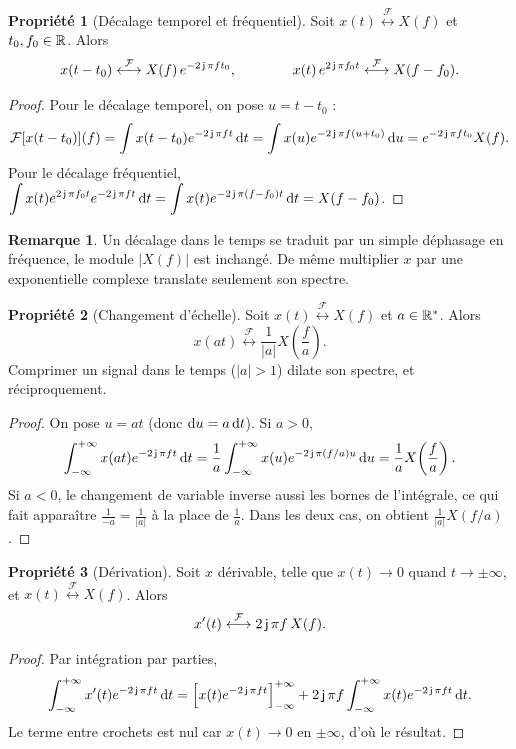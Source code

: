 \documentclass[a4paper,11pt]{article}
\theoremstyle{definition}
\newtheorem{proposition}{Propriété}[section]
\newtheorem{remark}{Remarque}[section]
\newcommand{\tf}{\overset{\mathcal F}{\longleftrightarrow}}
\begin{document}
\begin{proposition}[Décalage temporel et fréquentiel]
    \label{prop:decalages}
    Soit $x(t)\tf X(f)$ et $t_0,f_0\in{\mathbb{R}}$. Alors
    $$
        x(t-t_0) \tf X(f)\,e^{-2\complexj\pi ft_0}, \qquad\qquad x(t)\,e^{2\complexj\pi f_0t} \tf X(f-f_0).
    $$
\end{proposition}
\begin{proof}
    Pour le décalage temporel, on pose $u=t-t_0$ :
    $$
    \mathcal F[x(t-t_0)](f) = \int x(t-t_0)e^{-2\operatorname{\mathsf{j}}\pi ft}\,{\rm d} t = \int x(u)e^{-2\operatorname{\mathsf{j}}\pi f(u+t_0)}\,{\rm d} u = e^{-2\operatorname{\mathsf{j}}\pi ft_0}X(f).
    $$
    Pour le décalage fréquentiel, $\displaystyle\int x(t)e^{2\operatorname{\mathsf{j}}\pi f_0t}e^{-2\operatorname{\mathsf{j}}\pi ft}\,{\rm d} t = \int x(t)e^{-2\operatorname{\mathsf{j}}\pi (f-f_0)t}\,{\rm d} t = X(f-f_0)$.
\end{proof}

\begin{remark}
    Un décalage dans le temps se traduit par un simple déphasage en fréquence, le module $|X(f)|$ est inchangé. De même multiplier $x$ par une exponentielle complexe translate seulement son spectre.
\end{remark}

\begin{proposition}[Changement d'échelle]
    \label{prop:echelle}
    Soit $x(t)\tf X(f)$ et $a\in{\mathbb{R}}^*$. Alors
    $$
        x(at) \tf \frac{1}{|a|}X\!\left(\frac fa\right).
    $$
    Comprimer un signal dans le temps ($|a|>1$) dilate son spectre, et réciproquement.
\end{proposition}
\begin{proof}
    On pose $u=at$ (donc ${\rm d} u = a\,{\rm d} t$). Si $a>0$, $$\int_{-\infty}^{+\infty} x(at)e^{-2\operatorname{\mathsf{j}}\pi ft}\,{\rm d} t = \frac1a\int_{-\infty}^{+\infty} x(u)e^{-2\operatorname{\mathsf{j}}\pi (f/a)u}\,{\rm d} u = \frac1a X\!\left(\frac fa\right).$$ Si $a<0$, le changement de variable inverse aussi les bornes de l'intégrale, ce qui fait apparaître $\frac1{-a}=\frac1{|a|}$ à la place de $\frac1a$. Dans les deux cas, on obtient $\frac1{|a|}X(f/a)$.
\end{proof}

\begin{proposition}[Dérivation]
    \label{prop:derivation}
    Soit $x$ dérivable, telle que $x(t)\to0$ quand $t\to\pm\infty$, et $x(t)\tf X(f)$. Alors
    $$
        x'(t) \tf 2\complexj\pi f\,X(f).
    $$
\end{proposition}
\begin{proof}
    Par intégration par parties, $$\int_{-\infty}^{+\infty} x'(t)e^{-2\operatorname{\mathsf{j}}\pi ft}\,{\rm d} t = \Big[x(t)e^{-2\operatorname{\mathsf{j}}\pi ft}\Big]_{-\infty}^{+\infty} + 2\operatorname{\mathsf{j}}\pi f\int_{-\infty}^{+\infty}  x(t)e^{-2\operatorname{\mathsf{j}}\pi ft}\,{\rm d} t.$$ Le terme entre crochets est nul car $x(t)\to0$ en $\pm\infty$, d'où le résultat.
\end{proof}
\end{document}
